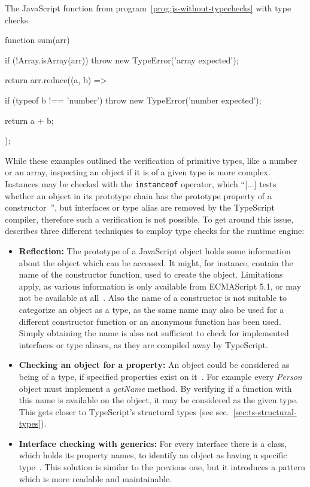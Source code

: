 \begin{program}
\caption{The JavaScript function from program~\ref{prog:js-without-typechecks} with type checks.}
\label{prog:js-with-typechecks}
\begin{JsCode}
function sum(arr) {
  if (!Array.isArray(arr)) {
    throw new TypeError('array expected');
  }
  
  return arr.reduce((a, b) => {
    if (typeof b !== 'number') {
      throw new TypeError('number expected');
    }
    
    return a + b;
  });
}
\end{JsCode}
\end{program}
While these examples outlined the verification of primitive types, like a number or an array, inspecting an object if it is of a given type is more complex. Instances may be checked with the \texttt{instanceof} operator, which ``[...] tests whether an object in its prototype chain has the prototype property of a constructor~\cite{instanceof:MDN:2017}'', but interfaces or type alias are removed by the TypeScript compiler, therefore such a verification is not possible. To get around this issue, \citeauthor{MasteringTypeScript:Rozentals:2015} describes three different techniques to employ type checks for the runtime engine:
\begin{itemize}
  \item \textbf{Reflection:} The prototype of a JavaScript object holds 
some information about the object which can be accessed. It might, for instance, contain the name of the constructor function, used to create the object. Limitations apply, as various
information is only available from ECMAScript 5.1, or may not be available at all~\cite[pp.~98--100]{MasteringTypeScript:Rozentals:2015}. Also the name of a constructor is not suitable to categorize an object as a type, as the same name may also be used for a different constructor function or an anonymous function has been used. Simply obtaining the name is also not sufficient to check for implemented interfaces or type aliases, as they are compiled away by TypeScript.
  \item \textbf{Checking an object for a property:} An object could be considered 
as being of a type, if specified properties exist on it~\cites[pp.~101--102]{MasteringTypeScript:Rozentals:2015}[pp.~18--20]{ProJavaScriptDesignPatterns:HarmesDiaz:2008}. For example every \textit{Person} object must implement a \textit{getName} method. By verifying if a function with this name is available on the object, it may be considered as the given type. This gets closer to TypeScript's structural types (see sec.~\ref{sec:ts-structural-types}).
  \item \textbf{Interface checking with generics:} For every interface there is a 
class, which holds its property names, to identify an object as 
having a specific type~\cites[pp.~102-105]{MasteringTypeScript:Rozentals:2015}[pp.~17--19]{ProJavaScriptDesignPatterns:HarmesDiaz:2008}. This solution is similar to the previous one, but it introduces a pattern which is more readable and maintainable.
\end{itemize}
